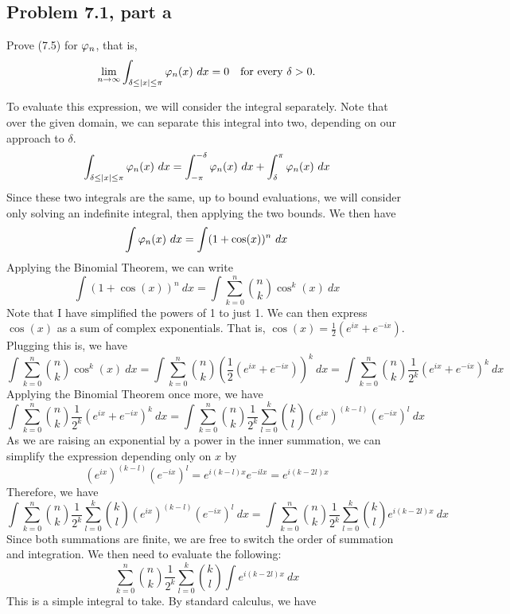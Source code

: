 \subsection{Problem 7.1, part a}
Prove (7.5) for $\varphi_n$, that is, 
\[\lim_{n\rightarrow \infty} \int_{\delta \leq |x| \leq \pi} \varphi_n (x) \ dx = 0 \quad \text {for every } \delta > 0.\]
\partbreak
\begin{solution}

    To evaluate this expression, we will consider the integral separately. Note that over the given domain, we can separate this integral into two, depending on our approach to $\delta$.
    \[\int_{\delta \leq |x| \leq \pi} \ph_n(x) \ dx = \int_{-\pi}^{-\delta} \ph_n(x) \ dx + \int_{\delta}^\pi \ph_n(x) \ dx\]
    Since these two integrals are the same, up to bound evaluations, we will consider only solving an indefinite integral, then applying the two bounds. We then have
    \[\int \varphi_n(x) \ dx = \int (1 + \cos(x))^n \ dx\]
    Applying the Binomial Theorem, we can write
    \[\int (1 + \cos(x))^n \ dx = \int \sum_{k = 0}^n {n\choose k} \cos^k (x) \ dx\]
    Note that I have simplified the powers of 1 to just 1. We can then express $\cos(x)$ as a sum of complex exponentials. That is, $\cos(x) = \frac{1}{2}(e^{ix} + e^{-ix})$. Plugging this is, we have
    \[\int \sum_{k = 0}^n {n\choose k} \cos^k (x) \ dx = \int \sum_{k = 0}^n {n\choose k} \left(\frac{1}{2} (e^{ix} + e^{-ix}) \right)^k \ dx = \int \sum_{k = 0}^n {n\choose k} \frac{1}{2^k}\left( e^{ix} + e^{-ix} \right)^k \ dx\]
    Applying the Binomial Theorem once more, we have
    \[\int \sum_{k = 0}^n {n\choose k} \frac{1}{2^k}\left( e^{ix} + e^{-ix} \right)^k \ dx = \int \sum_{k = 0}^n {n\choose k} \frac{1}{2^k}\sum_{l = 0}^k {k \choose l} \left( e^{ix}\right)^{(k - l)} \left( e^{-ix}\right)^l  \ dx\]
    As we are raising an exponential by a power in the inner summation, we can simplify the expression depending only on $x$ by
    \[\left( e^{ix}\right)^{(k - l)} \left( e^{-ix}\right)^l = e^{i(k - l)x}  e^{-ilx}=  e^{i(k - 2l)x}\]
    Therefore, we have 
    \[\int \sum_{k = 0}^n {n\choose k} \frac{1}{2^k}\sum_{l = 0}^k {k \choose l} \left( e^{ix}\right)^{(k - l)} \left( e^{-ix}\right)^l  \ dx = \int \sum_{k = 0}^n {n\choose k} \frac{1}{2^k}\sum_{l = 0}^k {k \choose l} e^{i(k - 2l)x} \ dx\]
    Since both summations are finite, we are free to switch the order of summation and integration. We then need to evaluate the following: 
    \[\sum_{k = 0}^n {n\choose k} \frac{1}{2^k}\sum_{l = 0}^k {k \choose l} \int e^{i(k - 2l)x} \ dx\]
    This is a simple integral to take. By standard calculus, we have 

\end{solution}
